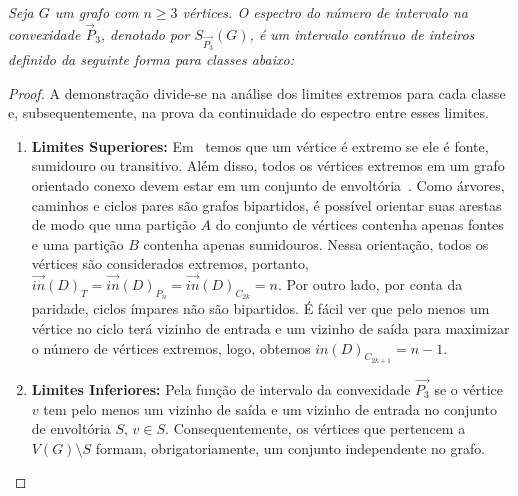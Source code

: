 \begin{theorem}
  \textit{Seja $G$ um grafo com $n \ge 3$ vértices. O espectro do número de intervalo na convexidade $\overrightarrow{P}_3$, denotado por $S_{\overrightarrow{P_3}}(G)$, é um intervalo contínuo de inteiros definido da seguinte forma para classes abaixo:}

  \begin{proof}
    A demonstração divide-se na análise dos limites extremos para cada classe e, subsequentemente, na prova da continuidade do espectro entre esses limites.

    \begin{enumerate}[leftmargin=*]
        \item \textbf{Limites Superiores:} Em~\cite{CHARTRAND2002115} temos que um vértice é extremo se ele é fonte, sumidouro ou transitivo. Além disso, todos os vértices extremos em um grafo orientado conexo devem estar em um conjunto de envoltória~\cite{CHARTRAND2003}. Como árvores, caminhos e ciclos pares são grafos bipartidos\cite{west2001introduction}, é possível orientar suas arestas de modo que uma partição $A$ do conjunto de vértices contenha apenas fontes e uma partição $B$ contenha apenas sumidouros. Nessa orientação, todos os vértices são considerados extremos, portanto, $\overrightarrow{in}(D)_T = \overrightarrow{in}(D)_{P_n} = \overrightarrow{in}(D)_{C_{2k}} = n$. Por outro lado, por conta da paridade, ciclos ímpares não são bipartidos. É fácil ver que pelo menos um vértice no ciclo terá vizinho de entrada e um vizinho de saída para maximizar o número de vértices extremos, logo, obtemos $in(D)_{C_{2k+1}} = n-1$.

        \item \textbf{Limites Inferiores:} Pela função de intervalo da convexidade $\overrightarrow{P_3}$ se o vértice $v$ tem pelo menos um vizinho de saída e um vizinho de entrada no conjunto de envoltória $S$, $v \in S$. Consequentemente, os vértices que pertencem a $V(G) \setminus S$ formam, obrigatoriamente, um conjunto independente no grafo.
    

\end{enumerate}
\end{proof}
\end{theorem}
